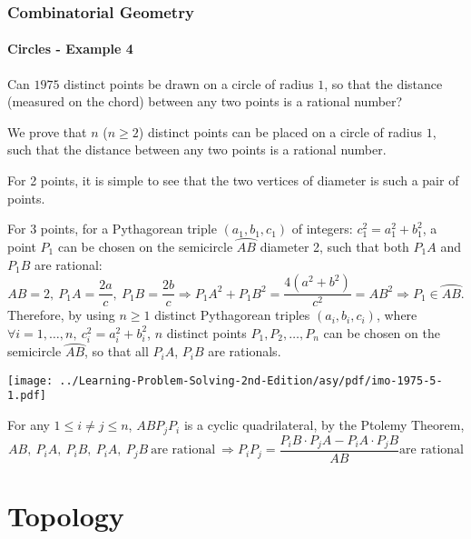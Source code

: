 \documentclass[8pt,xcolor=table,dvipsnames]{beamer}
\newcommand{\arc}[1]{\wideparen{#1}}
\begin{document}
\begin{frame}[t]
    \frametitle{Combinatorial Geometry}
    \framesubtitle{Circles - Example 4}
    \begin{example}[IMO 1975/5]
        Can $1975$ distinct points be drawn on a circle of radius $1$,
        so that the distance (measured on the chord) between any two points is a rational number?
    \end{example}
    \begin{overprint}
        We prove that $n$ ($n\ge 2$) distinct points can be placed on a circle of radius $1$,
        such that the distance between any two points is a rational number.
    
        \bigbreak
        For 2 points, it is simple to see that the two vertices of diameter is such a pair of points.
        
        \bigbreak
        For 3 points, for a Pythagorean triple $(a_1,b_1,c_1)$ of integers: $c_1^2=a_1^2+b_1^2$,
        a point $P_1$ can be chosen on the semicircle $\arc{AB}$ diameter 2, 
        such that both $P_1A$ and $P_1B$ are rational:
        \[
            AB=2,\ P_1A=\frac{2a}{c},\ P_1B=\frac{2b}{c} \Rightarrow P_1A^2+P_1B^2 = \frac{4(a^2+b^2)}{c^2}=AB^2
            \Rightarrow P_1 \in \arc{AB}.
        \]
        Therefore, by using $n \ge 1$ distinct Pythagorean triples $(a_i,b_i,c_i)$, where
        $\forall i=1,\ldots,n,\ c_i^2=a_i^2+b_i^2$,
        $n$ distinct points $P_1,P_2,\ldots,P_n$ can be chosen on the semicircle $\arc{AB}$,
        so that all $P_iA$, $P_iB$ are rationals.
        \begin{center}
            \texttt{[image: ../Learning-Problem-Solving-2nd-Edition/asy/pdf/imo-1975-5-1.pdf]}
        \end{center}
        For any $1 \le i \ne j \le n$, $ABP_jP_i$ is a cyclic quadrilateral,
        by the Ptolemy Theorem,
        \[
            AB,\ P_iA,\ P_iB,\ P_iA,\ P_jB\ \text{are rational}\ \Rightarrow
            P_iP_j = \frac{P_iB \cdot P_jA - P_iA \cdot P_jB}{AB} \text{are rational}
        \]
    \end{overprint}
\end{frame}

\section{Topology}
\end{document}
